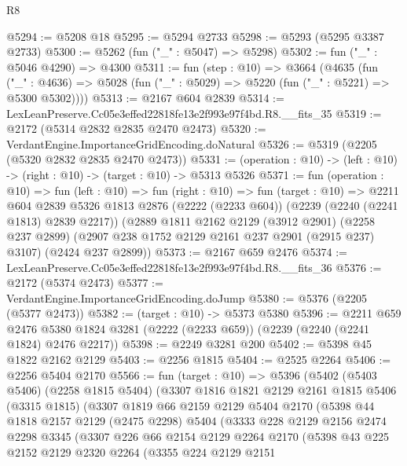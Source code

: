\begin{lexlean}{R8}
\begin{coremodule}
@5294 := @5208 @18
@5295 := @5294 @2733
@5298 := @5293 (@5295 @3387 @2733)
@5300 := @5262 (fun ("_" : @5047) => @5298)
@5302 := fun ("_" : @5046 @4290) => @4300
@5311 := fun (step : @10) =>
  @3664
    (@4635
      (fun ("_" : @4636) => @5028 (fun ("_" : @5029) => @5220 (fun ("_" : @5221) => @5300 @5302))))
@5313 := @2167 @604 @2839
@5314 := LexLeanPreserve.Cc05e3effed22818fe13e2f993e97f4bd.R8.__fits_35
@5319 := @2172 (@5314 @2832 @2835 @2470 @2473)
@5320 := VerdantEngine.ImportanceGridEncoding.doNatural
@5326 := @5319 (@2205 (@5320 @2832 @2835 @2470 @2473))
@5331 := (operation : @10) -> (left : @10) -> (right : @10) -> (target : @10) -> @5313 @5326
@5371 := fun (operation : @10) =>
  fun (left : @10) =>
  fun (right : @10) =>
  fun (target : @10) =>
  @2211
    @604
    @2839
    @5326
    @1813
    @2876
    (@2222 (@2233 @604))
    (@2239 (@2240 (@2241 @1813) @2839 @2217))
    (@2889
      @1811
      @2162
      @2129
      (@3912 @2901)
      (@2258 @237 @2899)
      (@2907 @238 @1752 @2129 @2161 @237 @2901 (@2915 @237) @3107)
      (@2424 @237 @2899))
@5373 := @2167 @659 @2476
@5374 := LexLeanPreserve.Cc05e3effed22818fe13e2f993e97f4bd.R8.__fits_36
@5376 := @2172 (@5374 @2473)
@5377 := VerdantEngine.ImportanceGridEncoding.doJump
@5380 := @5376 (@2205 (@5377 @2473))
@5382 := (target : @10) -> @5373 @5380
@5396 := @2211
    @659
    @2476
    @5380
    @1824
    @3281
    (@2222 (@2233 @659))
    (@2239 (@2240 (@2241 @1824) @2476 @2217))
@5398 := @2249 @3281 @200
@5402 := @5398 @45 @1822 @2162 @2129
@5403 := @2256 @1815
@5404 := @2525 @2264
@5406 := @2256 @5404 @2170
@5566 := fun (target : @10) =>
  @5396
    (@5402
      (@5403 @5406)
      (@2258 @1815 @5404)
      (@3307
        @1816
        @1821
        @2129
        @2161
        @1815
        @5406
        (@3315 @1815)
        (@3307
          @1819
          @66
          @2159
          @2129
          @5404
          @2170
          (@5398
            @44
            @1818
            @2157
            @2129
            (@2475 @2298)
            @5404
            (@3333
              @228
              @2129
              @2156
              @2474
              @2298
              @3345
              (@3307
                @226
                @66
                @2154
                @2129
                @2264
                @2170
                (@5398
                  @43
                  @225
                  @2152
                  @2129
                  @2320
                  @2264
                  (@3355
                    @224
                    @2129
                    @2151

\end{coremodule}
\end{lexlean}
